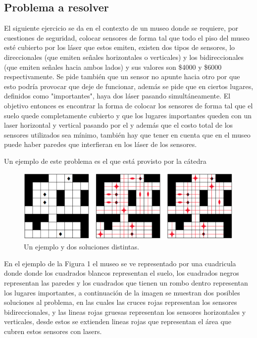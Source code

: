 \subsection{Problema a resolver}

El siguiente ejercicio se da en el contexto de un museo donde se requiere, por cuestiones de seguridad, colocar sensores de forma tal que todo el piso del museo esté cubierto por los láser que estos emiten, existen dos tipos de sensores, lo direccionales (que emiten señales horizontales o verticales) y los bidireccionales (que emiten señales hacia ambos lados) y sus valores son \$4000 y \$6000 respectivamente. Se pide también que un sensor no apunte hacia otro por que esto podría provocar que deje de funcionar, además se pide que en ciertos lugares, definidos como "importantes", haya dos láser pasando simultáneamente. El objetivo entonces es encontrar la forma de colocar los sensores de forma tal que el suelo quede completamente cubierto y que los lugares importantes queden con un laser horizontal y vertical pasando por el y además que el costo total de los sensores utilizados sea mínimo, también hay que tener en cuenta que en el museo puede haber paredes que interfieran en los láser de los sensores.

Un ejemplo de este problema es el que está provisto por la cátedra

\begin{figure}[H]
	\begin{center}
		\includegraphics[width=320pt]{../imgs/ej3_ejemploCatedra.png}
	\end{center}
\caption{Un ejemplo y dos soluciones distintas.}
\end{figure}

En el ejemplo de la Figura 1 el museo se ve representado por una cuadricula donde donde los cuadrados blancos representan el suelo, los cuadrados negros representan las paredes y los cuadrados que tienen un rombo dentro representan los lugares importantes, a continuación de la imagen se muestran dos posibles soluciones al problema, en las cuales las cruces rojas representan los sensores bidireccionales, y las lineas rojas gruesas representan los sensores horizontales y verticales, desde estos se extienden lineas rojas que representan el área que cubren estos sensores con lasers.

